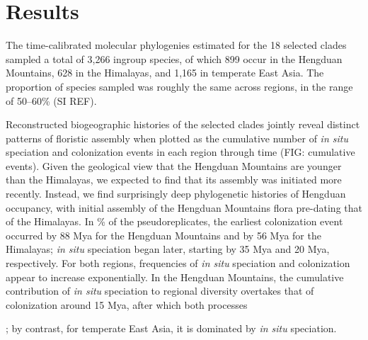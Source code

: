 \section{Results}

The time-calibrated molecular phylogenies estimated for the 18 selected clades sampled a total of 3,266 ingroup species, of which 899 occur in the Hengduan Mountains, 628 in the Himalayas, and 1,165 in temperate East Asia. The proportion of species sampled was roughly the same across regions, in the range of 50--60\% (SI REF).

Reconstructed biogeographic histories of the selected clades jointly reveal distinct patterns of floristic assembly when plotted as the cumulative number of \textit{in situ} speciation and colonization events in each region through time (FIG: cumulative events). Given the geological view that the Hengduan Mountains are younger than the Himalayas, we expected to find that its assembly was initiated more recently. Instead, we find surprisingly deep phylogenetic histories of Hengduan occupancy, with initial assembly of the Hengduan Mountains flora pre-dating that of the Himalayas. In \% of the pseudoreplicates, the earliest colonization event occurred by 88 Mya for the Hengduan Mountains and by 56 Mya for the Himalayas; \textit{in situ} speciation began later, starting by 35 Mya and 20 Mya, respectively. For both regions, frequencies of \textit{in situ} speciation and colonization appear to increase exponentially. In the Hengduan Mountains, the cumulative contribution of \textit{in situ} speciation to regional diversity overtakes that of colonization around 15 Mya, after which both processes 

; by contrast, for temperate East Asia, it is dominated by \textit{in situ} speciation. 